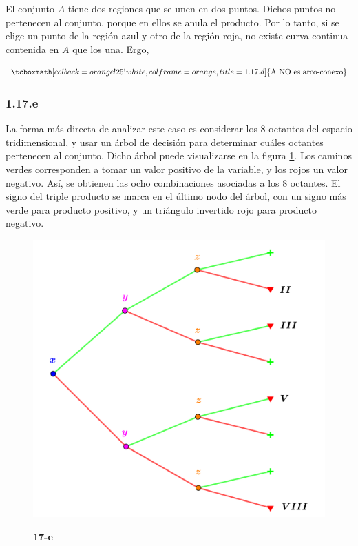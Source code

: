 \documentclass{article}
\begin{document}
El conjunto $A$ tiene dos regiones que se unen en dos puntos. Dichos puntos no pertenecen al conjunto, porque en ellos se anula el producto. Por lo tanto, si se elige un punto de la región azul y otro de la región roja, no existe curva continua contenida en $A$ que los una. Ergo,

\begin{equation}
\tcboxmath[colback=orange!25!white,colframe=orange,title=1.17.d]
{ \text{A NO es arco-conexo} }
\end{equation}

\subsubsection*{1.17.e}
\label{subsubsec:1.17.e}

La forma más directa de analizar este caso es considerar los 8 octantes del espacio tridimensional, y usar un árbol de decisión para determinar cuáles octantes pertenecen al conjunto. Dicho árbol puede visualizarse en la figura \ref{fig:1-17-e}. Los caminos verdes corresponden a tomar un valor positivo de la variable, y los rojos un valor negativo. Así, se obtienen las ocho combinaciones asociadas a los 8 octantes. El signo del triple producto se marca en el último nodo del árbol, con un signo más verde para producto positivo, y un triángulo invertido rojo para producto negativo.

\begin{figure}[ht]
\caption{\textbf{17-e}}
\includegraphics[scale=0.5]{img/ejercicios/1/17-e.png} 
\centering
\label{fig:1-17-e}
\end{figure}
\end{document}
